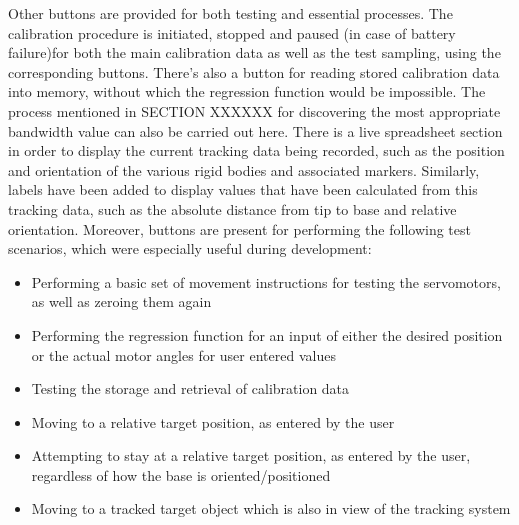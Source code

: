 \documentclass[11pt]{article}
\begin{document}
Other buttons are provided for both testing and essential processes. The calibration procedure is initiated, stopped and paused (in case of battery failure)for both the main calibration data as well as the test sampling, using the corresponding buttons. There's also a button for reading stored calibration data into memory, without which the regression function would be impossible. The process mentioned in SECTION XXXXXX for discovering the most appropriate bandwidth value can also be carried out here. There is a live spreadsheet section in order to display the current tracking data being recorded, such as the position and orientation of the various rigid bodies and associated markers. Similarly, labels have been added to display values that have been calculated from this tracking data, such as the absolute distance from tip to base and relative orientation. Moreover, buttons are present for performing the following test scenarios, which were especially useful during development:
\begin{itemize}
\item{Performing a basic set of movement instructions for testing the servomotors, as well as zeroing them again}
\item{Performing the regression function for an input of either the desired position or the actual motor angles for user entered values}
\item{Testing the storage and retrieval of calibration data}
\item{Moving to a relative target position, as entered by the user}
\item{Attempting to stay at a relative target position, as entered by the user, regardless of how the base is oriented/positioned}
\item{Moving to a tracked target object which is also in view of the tracking system}
\end{itemize}
\end{document}
